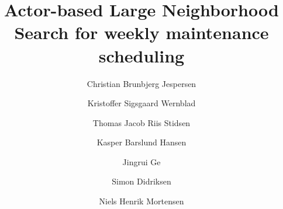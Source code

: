 \documentclass[preprint,12pt,authoryear]{elsarticle}
\begin{document}
\begin{frontmatter}



\title{Actor-based Large Neighborhood Search for weekly maintenance scheduling} %


\author[DTUconstruct]{Christian Brunbjerg Jespersen} %
\author[DTUconstruct]{Kristoffer Sigsgaard Wernblad}
\author[DTUmanagement]{Thomas Jacob Riis Stidsen}
\author[DTUconstruct]{Kasper Barslund Hansen}
\author[DTUconstruct]{Jingrui Ge}
\author[DTUconstruct]{Simon Didriksen}
\author[DTUconstruct]{Niels Henrik Mortensen}


\end{frontmatter}
\end{document}

